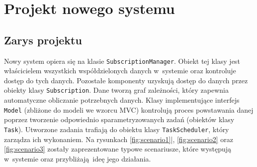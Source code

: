 \chapter{Projekt nowego systemu}

\section{Zarys projektu}
Nowy system opiera się na klasie \lstinline$SubscriptionManager$. Obiekt tej klasy jest właścicielem wszystkich współdzielonych danych w~systemie oraz kontroluje dostęp do tych danych. Pozostałe komponenty uzyskują dostęp do danych przez obiekty klasy \lstinline$Subscription$. Dane tworzą graf zależności, który zapewnia automatyczne obliczanie potrzebnych danych. Klasy implementujące interfejs \lstinline$Model$ (zbliżone do modeli we wzorcu MVC) kontrolują proces powstawania danej poprzez tworzenie odpowiednio sparametryzowanych zadań (obiektów klasy \lstinline$Task$). Utworzone zadania trafiają do obiektu klasy \lstinline$TaskScheduler$, który zarządza ich wykonaniem. Na rysunkach \ref{fig:scenario1}|, \ref{fig:scenario2} oraz \ref{fig:scenario3} zostały zaprezentowane typowe scenariusze, które występują w~systemie oraz przybliżają ideę jego działania.

